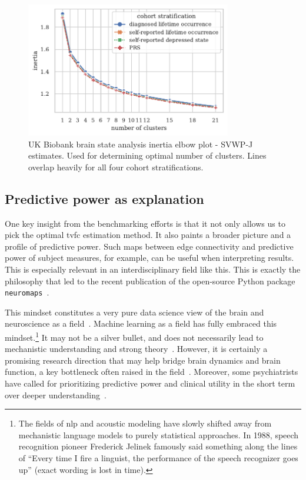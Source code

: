 \begin{figure}[t]
  \centering
  \includegraphics[width=0.8\textwidth]{fig/ukbiobank/brain_states/inertias_SVWP_joint}
  \caption{
    UK Biobank brain state analysis inertia elbow plot - SVWP-J estimates.
    Used for determining optimal number of clusters.
    Lines overlap heavily for all four cohort stratifications.
  }\label{fig:ukb-results-brain-states-elbow-plot}
\end{figure}


\subsection{Predictive power as explanation}

One key insight from the benchmarking efforts is that it not only allows us to pick the optimal \gls{tvfc} estimation method.
It also paints a broader picture and a profile of predictive power.
Such maps between edge connectivity and predictive power of subject measures, for example, can be useful when interpreting results.
This is especially relevant in an interdisciplinary field like this.
This is exactly the philosophy that led to the recent publication of the open-source Python package \texttt{neuromaps}~\parencite{Markello2022}.

This mindset constitutes a very pure data science view of the brain and neuroscience as a field~\parencite[see also][]{Yarkoni2017}.
Machine learning as a field has fully embraced this mindset.\footnote{The fields of \gls{nlp} and acoustic modeling have slowly shifted away from mechanistic language models to purely statistical approaches. In 1988, speech recognition pioneer Frederick Jelinek famously said something along the lines of ``Every time I fire a linguist, the performance of the speech recognizer goes up'' (exact wording is lost in time).}
It may not be a silver bullet, and does not necessarily lead to mechanistic understanding and strong theory~\parencite[see e.g.][]{Jonas2017}.
However, it is certainly a promising research direction that may help bridge brain dynamics and brain function, a key bottleneck often raised in the field~\parencite{Kopell2014}.
Moreover, some psychiatrists have called for prioritizing predictive power and clinical utility in the short term over deeper understanding~\parencite{Paulus2015, Winter2022}.
